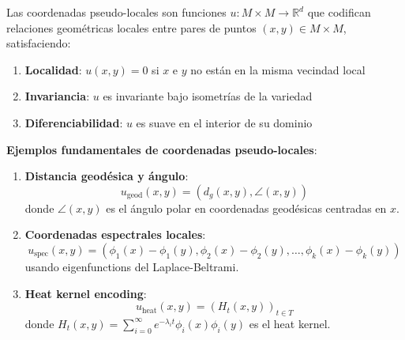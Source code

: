 \begin{definition}\label{def:coordenadas_pseudo_locales}
Las coordenadas pseudo-locales son funciones $u: M \times M \to \mathbb{R}^d$ que codifican relaciones geométricas locales entre pares de puntos $(x, y) \in M \times M$, satisfaciendo:
\begin{enumerate}
    \item \textbf{Localidad}: $u(x, y) = 0$ si $x$ e $y$ no están en la misma vecindad local
    \item \textbf{Invariancia}: $u$ es invariante bajo isometrías de la variedad
    \item \textbf{Diferenciabilidad}: $u$ es suave en el interior de su dominio
\end{enumerate}
\end{definition}

\textbf{Ejemplos fundamentales de coordenadas pseudo-locales}:

\begin{enumerate}
    \item \textbf{Distancia geodésica y ángulo}:
    \begin{equation}
    u_{\text{geod}}(x, y) = (d_g(x, y), \angle(x, y))
    \end{equation}
    donde $\angle(x, y)$ es el ángulo polar en coordenadas geodésicas centradas en $x$.
    
    \item \textbf{Coordenadas espectrales locales}:
    \begin{equation}
    u_{\text{spec}}(x, y) = (\phi_1(x) - \phi_1(y), \phi_2(x) - \phi_2(y), \ldots, \phi_k(x) - \phi_k(y))
    \end{equation}
    usando eigenfunctions del Laplace-Beltrami.
    
    \item \textbf{Heat kernel encoding}:
    \begin{equation}
    u_{\text{heat}}(x, y) = (H_t(x, y))_{t \in T}
    \end{equation}
    donde $H_t(x, y) = \sum_{i=0}^{\infty} e^{-\lambda_i t} \phi_i(x) \phi_i(y)$ es el heat kernel.
\end{enumerate}

